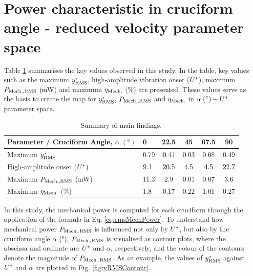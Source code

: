 \documentclass[oneside]{utmthesis}
\begin{document}
\section{Power characteristic in cruciform angle - reduced velocity parameter space}\label{sec:powerCharacteristic}

Table \ref{tab:mainFindings} summarises the key values observed in this study. In the table, key values such as the maximum $y^{*}_{\text{RMS}}$, high-amplitude vibration onset ($U^{*}$), maximum $P_{\text{Mech.,RMS}}$ (mW) and maximum $\eta_{\text{Mech.}}$ (\%) are presented. These values serve as the basis to create the map for $y^{*}_{\text{RMS}}$, $P_{\text{Mech.,RMS}}$ and $\eta_{\text{Mech.}}$ in $\alpha \; (\si{\degree})-\ured$ parameter space.

 \begin{table}[!ht]
 \centering
 \caption{Summary of main findings.} \label{tab:mainFindings}
 \vspace{\baselineskip}
 \setlength{\tabcolsep}{10pt}      %
 \renewcommand{\arraystretch}{1.5} %
 \begin{tabular}{l l c c c c}
   \hline
   \hline
 Parameter / Cruciform Angle, $\alpha \; (\si{\degree})$ & 0       & 22.5    & 45      & 67.5    & 90      \\
   \hline
 Maximum $y^{*}_{\text{RMS}}$                                       & 0.79    & 0.41    & 0.03    & 0.08    & 0.49    \\
 High-amplitude onset ($U^{*}$)                        & $9.1$ & $20.5$ & $4.5$ & $4.5$ & $22.7$ \\
 Maximum $P_{\text{Mech.,RMS}}$ (mW)               & 11.3    & 2.9     & 0.01    & 0.07    & 3.6     \\
 Maximum $\eta_{\text{Mech.}}$ (\%)        & 1.8     & 0.17    & 0.22    & 1.01    & 0.27    \\
   \hline
   \hline
 \end{tabular}
 \end{table}

In this study, the mechanical power is computed for each cruciform through the application of the formula in Eq. \ref{eq:rmsMechPower}. To understand how mechanical power $P_{\text{Mech.,RMS}}$ is influenced not only by $U^{*}$, but also by the cruciform angle $\alpha$ (\si{\degree}), $P_{\text{Mech.,RMS}}$ is visualised as contour plots, where the abscissa and ordinate are $U^{*}$ and $\alpha$, respectively, and the colour of the contours denote the magnitude of $P_{\text{Mech.,RMS}}$. As an example, the values of $y^{*}_{\text{RMS}}$ against $U^{*}$ and $\alpha$ are plotted in Fig. \ref{fig:yRMSContour}.
\end{document}
